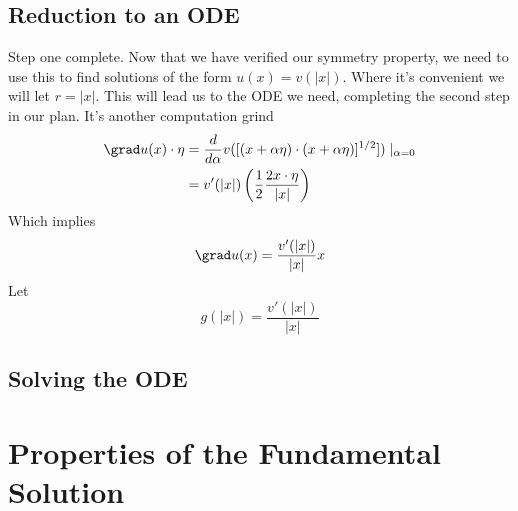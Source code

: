 \documentclass{bkcnotes}
\begin{document}
\subsection{Reduction to an ODE}
Step one complete. Now that we have verified our symmetry property, we
need to use this to find solutions of the form $u(x) = v(|x|)$. Where
it's convenient we will let $r = |x|$. This will lead us to the ODE we
need, completing the second step in our plan. It's another computation
grind
\begin{equation}
  \label{eq:grad-u-comp}
  \begin{aligned}
    \grad u(x) \cdot \eta &= \frac{d}{d\alpha} v([(x+\alpha\eta)\cdot
    (x+\alpha\eta)]^{1/2}])\mid_{\alpha = 0} \\
    &= v'(|x|)\left(\frac{1}{2}\frac{2x\cdot\eta}{|x|}\right)
  \end{aligned}
\end{equation}
Which implies
\begin{equation}
  \label{eq:grad-u}
  \grad u(x) = \frac{v'(|x|)}{|x|}x
\end{equation}
Let
\begin{equation}
  \label{eq:g-def}
  g(|x|) = \frac{v'(|x|)}{|x|}
\end{equation}

\subsection{Solving the ODE}

\section{Properties of the Fundamental Solution}
\end{document}
